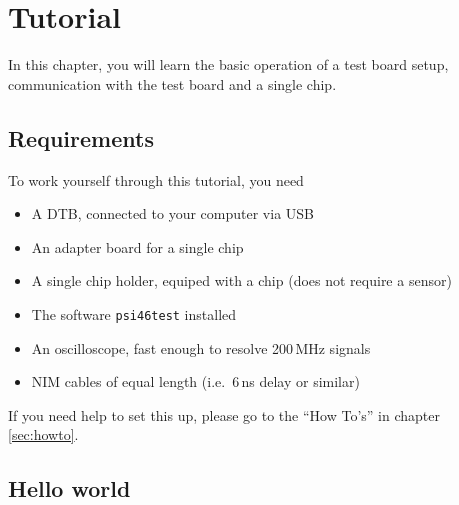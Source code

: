 \chapter{Tutorial}
In this chapter, you will learn the basic operation of a test board setup, communication with the test board and a single chip.

\section{Requirements}
To work yourself through this tutorial, you need
\begin{itemize}
    \item A DTB, connected to your computer via USB
    \item An adapter board for a single chip
    \item A single chip holder, equiped with a chip (does not require a sensor)
    \item The software \texttt{psi46test} installed
    \item An oscilloscope, fast enough to resolve 200\,MHz signals
    \item NIM cables of equal length (i.e.\, 6\,ns delay or similar)
\end{itemize}


If you need help to set this up, please go to the \enquote{How To's} in chapter \ref{sec:howto}.


\section{Hello world}



